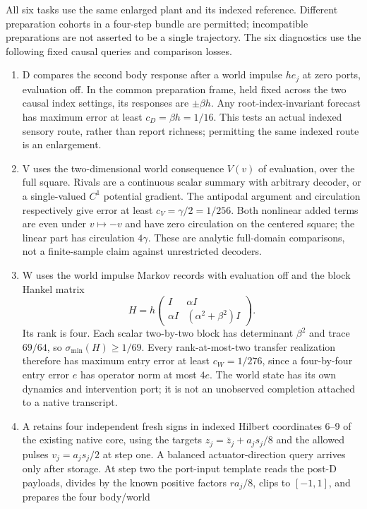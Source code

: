 \documentclass[11pt,a4paper]{article}
\theoremstyle{definition}
\begin{document}
All six tasks use the same enlarged plant and its indexed reference. Different
preparation cohorts in a four-step bundle are permitted; incompatible
preparations are not asserted to be a single trajectory. The six diagnostics
use the following fixed causal queries and comparison losses.

\begin{enumerate}[leftmargin=1.5em]
\item D compares the second body response after a world impulse $he_j$ at
zero ports, evaluation off. In the common preparation frame, held fixed across the two causal index
settings, its responses are $\pm\beta h$. Any root-index-invariant forecast has maximum error at
least $c_D=\beta h=1/16$. This tests an actual indexed sensory route, rather
than report richness; permitting the same indexed route is an enlargement.
\item V uses the two-dimensional world consequence $V(v)$ of evaluation,
over the full square. Rivals are a continuous scalar summary with arbitrary
decoder, or a single-valued $C^1$ potential gradient. The antipodal argument
and circulation respectively give error at least
$c_V=\gamma/2=1/256$. Both nonlinear added terms are even under $v\mapsto-v$
and have zero circulation on the centered square; the linear part has
circulation $4\gamma$. These are analytic full-domain comparisons, not a
finite-sample claim against unrestricted decoders.
\item W uses the world impulse Markov records with evaluation off and the
block Hankel matrix
\[
 H=h\begin{pmatrix}I&\alpha I\\\alpha I&(\alpha^2+\beta^2)I\end{pmatrix}.
\]
Its rank is four. Each scalar two-by-two block has determinant $\beta^2$
and trace $69/64$, so $\sigma_{\min}(H)\ge1/69$. Every rank-at-most-two
transfer realization therefore has maximum entry error at least
$c_W=1/276$, since a four-by-four entry error $e$ has operator norm at most
$4e$. The world state has its own dynamics and intervention port; it is not
an unobserved completion attached to a native transcript.
\item A retains four independent fresh signs in indexed Hilbert coordinates
6--9 of the existing native core, using the targets
$z_j=\bar z_j+a_js_j/8$ and the allowed pulses $v_j=a_js_j/2$ at step one.
A balanced actuator-direction query arrives only after storage. At step two
the port-input template reads the post-D payloads, divides by the known
positive factors $ra_j/8$, clips to $[-1,1]$, and prepares the four body/world

\end{enumerate}
\end{document}
